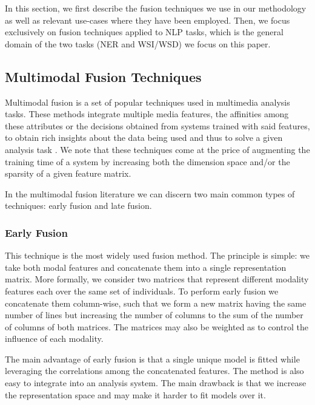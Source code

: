 \documentclass{llncs}
\begin{document}
In this section, we first describe the fusion techniques we use in our methodology as well as relevant use-cases where they have been employed. Then, we focus exclusively on fusion techniques applied to NLP tasks, which is the general domain of the two tasks (NER and WSI/WSD) we focus on this paper.                                                                                                                 
\subsection{Multimodal Fusion Techniques}
Multimodal fusion is a set of popular techniques used in multimedia analysis tasks. These methods integrate multiple media features, the affinities among these attributes or the decisions obtained from systems trained with said features, to obtain rich insights about the data being used and thus to solve a given analysis  task \cite{Ah-PineCC15,AtreyHEK10}. We note that these techniques come at the price of augmenting the training time of a system by increasing both the dimension space and/or the sparsity of a given feature matrix.


In the multimodal fusion literature we can discern two main common types of techniques: early fusion and late fusion. 
\subsubsection{Early Fusion}
This technique is the most widely used fusion method. The principle is simple: we take both modal features and concatenate them into a single representation matrix. More formally, we consider two matrices  that represent different modality features each  over the same set of individuals. To perform early fusion we concatenate them column-wise, such that we form a new matrix having the same number of lines but increasing the number of columns to the sum of the number of columns of both matrices. The matrices may also be weighted as to control the influence of each modality.

The main advantage of early fusion is that a single unique model is fitted while leveraging the correlations among the concatenated features. The method is also easy to integrate into an analysis system. The main drawback is that we increase the representation space and may make it harder to fit models over it.
%

\end{document}
